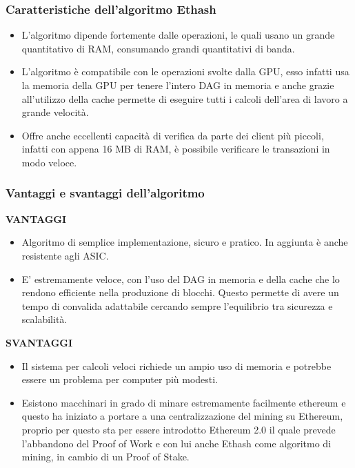 \documentclass[a4paper,11pt]{report}
\begin{document}
\subsubsection{Caratteristiche dell'algoritmo Ethash}
\begin{itemize}
\item L'algoritmo dipende fortemente dalle operazioni, le quali usano un grande quantitativo di RAM, consumando grandi quantitativi di banda.
\item L'algoritmo è compatibile con le operazioni svolte dalla GPU, esso infatti usa la memoria della GPU per tenere l'intero DAG in memoria e anche grazie all'utilizzo della cache permette di eseguire tutti i calcoli dell'area di lavoro a grande velocità.
\item Offre anche eccellenti capacità di verifica da parte dei client più piccoli, infatti con appena 16 MB di RAM, è possibile verificare le transazioni in modo veloce.
\end{itemize}

\subsubsection{Vantaggi e svantaggi dell'algoritmo}
\textbf{VANTAGGI}\\
\begin{itemize}
\item Algoritmo di semplice implementazione, sicuro e pratico. In aggiunta è anche resistente agli ASIC.
\item E' estremamente veloce, con l'uso del DAG in memoria e della cache che lo rendono efficiente nella produzione di blocchi. Questo permette di avere un tempo di convalida adattabile cercando sempre l'equilibrio tra sicurezza e scalabilità.
\end{itemize}
\textbf{SVANTAGGI}\\
\begin{itemize}
\item Il sistema per calcoli veloci richiede un ampio uso di memoria e potrebbe essere un problema per computer più modesti.
\item Esistono macchinari in grado di minare estremamente facilmente ethereum e questo ha iniziato a portare a una centralizzazione del mining su Ethereum, proprio per questo sta per essere introdotto Ethereum 2.0 il quale prevede l'abbandono del Proof of Work e con lui anche Ethash come algoritmo di mining, in cambio di un Proof of Stake.  
\end{itemize}
\end{document}
